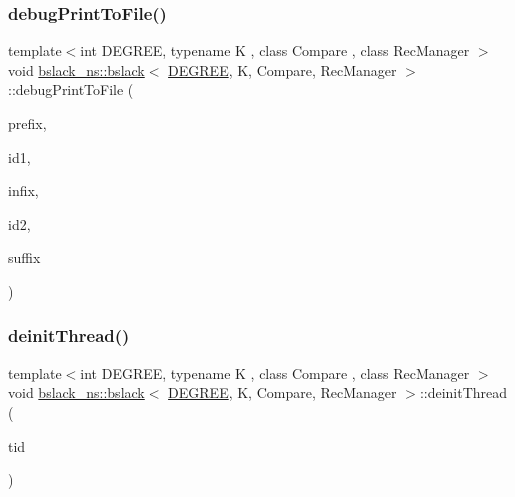 \subsubsection{\texorpdfstring{debug\+Print\+To\+File()}{debugPrintToFile()}}
{\footnotesize\ttfamily template$<$int D\+E\+G\+R\+EE, typename K , class Compare , class Rec\+Manager $>$ \\
void \hyperlink{classbslack__ns_1_1bslack}{bslack\+\_\+ns\+::bslack}$<$ \hyperlink{brown__sigouin__abtree__kcas_2adapter_8h_a5d88b17d70c985f2f2b8e987037fd6dd}{D\+E\+G\+R\+EE}, K, Compare, Rec\+Manager $>$\+::debug\+Print\+To\+File (\begin{DoxyParamCaption}\item[{std\+::string}]{prefix,  }\item[{long}]{id1,  }\item[{std\+::string}]{infix,  }\item[{long}]{id2,  }\item[{std\+::string}]{suffix }\end{DoxyParamCaption})\hspace{0.3cm}{\ttfamily [inline]}}

\mbox{\label{classbslack__ns_1_1bslack_a530a1fb09e721e94b1b8e09be76bc2cd}} 
\subsubsection{\texorpdfstring{deinit\+Thread()}{deinitThread()}}
{\footnotesize\ttfamily template$<$int D\+E\+G\+R\+EE, typename K , class Compare , class Rec\+Manager $>$ \\
void \hyperlink{classbslack__ns_1_1bslack}{bslack\+\_\+ns\+::bslack}$<$ \hyperlink{brown__sigouin__abtree__kcas_2adapter_8h_a5d88b17d70c985f2f2b8e987037fd6dd}{D\+E\+G\+R\+EE}, K, Compare, Rec\+Manager $>$\+::deinit\+Thread (\begin{DoxyParamCaption}\item[{const int}]{tid }\end{DoxyParamCaption})\hspace{0.3cm}{\ttfamily [inline]}}

\mbox{\label{classbslack__ns_1_1bslack_a0408939d386f11ba69b32131e1ada653}} 
